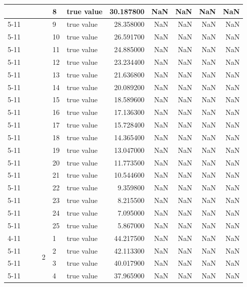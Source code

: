 \begin{tabular}{llllllrrrrr}
 &  &  &  & 8 & true value & 30.187800 & NaN & NaN & NaN & NaN \\
\cline{5-11}
 &  &  &  & 9 & true value & 28.358000 & NaN & NaN & NaN & NaN \\
\cline{5-11}
 &  &  &  & 10 & true value & 26.591700 & NaN & NaN & NaN & NaN \\
\cline{5-11}
 &  &  &  & 11 & true value & 24.885000 & NaN & NaN & NaN & NaN \\
\cline{5-11}
 &  &  &  & 12 & true value & 23.234400 & NaN & NaN & NaN & NaN \\
\cline{5-11}
 &  &  &  & 13 & true value & 21.636800 & NaN & NaN & NaN & NaN \\
\cline{5-11}
 &  &  &  & 14 & true value & 20.089200 & NaN & NaN & NaN & NaN \\
\cline{5-11}
 &  &  &  & 15 & true value & 18.589600 & NaN & NaN & NaN & NaN \\
\cline{5-11}
 &  &  &  & 16 & true value & 17.136300 & NaN & NaN & NaN & NaN \\
\cline{5-11}
 &  &  &  & 17 & true value & 15.728400 & NaN & NaN & NaN & NaN \\
\cline{5-11}
 &  &  &  & 18 & true value & 14.365400 & NaN & NaN & NaN & NaN \\
\cline{5-11}
 &  &  &  & 19 & true value & 13.047000 & NaN & NaN & NaN & NaN \\
\cline{5-11}
 &  &  &  & 20 & true value & 11.773500 & NaN & NaN & NaN & NaN \\
\cline{5-11}
 &  &  &  & 21 & true value & 10.544600 & NaN & NaN & NaN & NaN \\
\cline{5-11}
 &  &  &  & 22 & true value & 9.359800 & NaN & NaN & NaN & NaN \\
\cline{5-11}
 &  &  &  & 23 & true value & 8.215500 & NaN & NaN & NaN & NaN \\
\cline{5-11}
 &  &  &  & 24 & true value & 7.095000 & NaN & NaN & NaN & NaN \\
\cline{5-11}
 &  &  &  & 25 & true value & 5.867000 & NaN & NaN & NaN & NaN \\
\cline{4-11} \cline{5-11}
 &  &  & \multirow[t]{25}{*}{2} & 1 & true value & 44.217500 & NaN & NaN & NaN & NaN \\
\cline{5-11}
 &  &  &  & 2 & true value & 42.113300 & NaN & NaN & NaN & NaN \\
\cline{5-11}
 &  &  &  & 3 & true value & 40.017900 & NaN & NaN & NaN & NaN \\
\cline{5-11}
 &  &  &  & 4 & true value & 37.965900 & NaN & NaN & NaN & NaN \\

\end{tabular}
